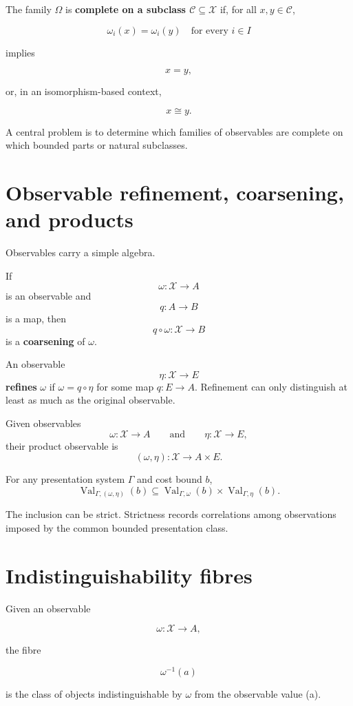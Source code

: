 \documentclass[11pt]{article}
\begin{document}
The family \(\Omega\) is \textbf{complete on a subclass \(\mathcal C\subseteq\mathcal X\)} if, for all \(x,y\in\mathcal C\),

\[
\omega_i(x)=\omega_i(y)\quad\text{for every }i\in I
\]

implies

\[
x=y,
\]

or, in an isomorphism-based context,

\[
x\cong y.
\]

A central problem is to determine which families of observables are complete on which bounded parts or natural subclasses.


\section{Observable refinement, coarsening, and products}

Observables carry a simple algebra.

If
\[
\omega:\mathcal X\to A
\]
is an observable and
\[
q:A\to B
\]
is a map, then
\[
q\circ\omega:\mathcal X\to B
\]
is a \textbf{coarsening} of \(\omega\).

An observable
\[
\eta:\mathcal X\to E
\]
\textbf{refines} \(\omega\) if \(\omega=q\circ\eta\) for some map \(q:E\to A\). Refinement can only distinguish at least as much as the original observable.

Given observables
\[
\omega:\mathcal X\to A
\qquad\text{and}\qquad
\eta:\mathcal X\to E,
\]
their product observable is
\[
(\omega,\eta):\mathcal X\to A\times E.
\]

For any presentation system \(\Gamma\) and cost bound \(b\),
\[
\operatorname{Val}_{\Gamma,(\omega,\eta)}(b)
\subseteq
\operatorname{Val}_{\Gamma,\omega}(b)\times
\operatorname{Val}_{\Gamma,\eta}(b).
\]

The inclusion can be strict. Strictness records correlations among observations imposed by the common bounded presentation class.


\section{Indistinguishability fibres}

Given an observable

\[
\omega:\mathcal X\to A,
\]

the fibre

\[
\omega^{-1}(a)
\]

is the class of objects indistinguishable by \(\omega\) from the observable value (a).
\end{document}
